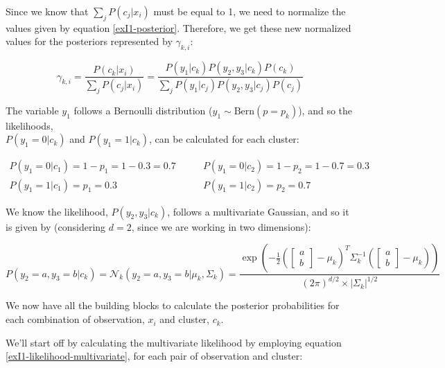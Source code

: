 \documentclass[12pt]{article}
\begin{document}
\begin{enumerate}[leftmargin=\labelsep]
        Since we know that $\sum_j P(c_j|x_i)$ must be equal to 1, we need to normalize the values given by equation \eqref{exI1-posterior}.
        Therefore, we get these new normalized values for the posteriors represented by $\gamma_{k,i}$:

        \begin{equation}\label{exI1-gamma}
          \gamma_{k,i} = \frac{P(c_k | x_i)}{\sum_j P(c_j | x_i)}
          = \frac{P(y_1|c_k)P(y_2,y_3|c_k)P(c_k)}{\sum_j P(y_1|c_j)P(y_2,y_3|c_j)P(c_j)}
        \end{equation}

        The variable $y_1$ follows a Bernoulli distribution ($y_1 \sim \text{Bern}\left(p=p_k\right)$), and so the likelihoods,\\
        $P(y_1=0|c_k)$ and $P(y_1=1|c_k)$, can be calculated for each cluster:

        \vskip -0.4cm
        \begin{align*}
          P(y_1 = 0 | c_1) = 1 - p_1 = 1 - 0.3 = 0.7 & \qquad P(y_1 = 0 | c_2) = 1 - p_2 = 1 - 0.7 = 0.3 \\
          P(y_1 = 1 | c_1) = p_1 = 0.3               & \qquad P(y_1 = 1 | c_2) = p_2 = 0.7
        \end{align*}

        We know the likelihood, $P(y_2,y_3|c_k)$, follows a multivariate Gaussian, and so it is given by
        (considering $d = 2$, since we are working in two dimensions):

        \vskip -0.2cm
        \begin{equation}\label{exI1-likelihood-multivariate}
          P(y_2=a,y_3=b|c_k) = \mathcal{N}_k(y_2=a,y_3=b|\mu_k, \Sigma_k)
          = \frac{
          \exp\left(-\frac{1}{2} \left(\begin{bmatrix} a \\ b \end{bmatrix} - \mu_k\right)^T
          \Sigma_k^{-1} \left(\begin{bmatrix} a \\ b \end{bmatrix} - \mu_k\right)\right)}{(2\pi)^{d/2} \times |\Sigma_k|^{1/2}}
        \end{equation}

        We now have all the building blocks to calculate the posterior probabilities
        for each combination of observation, $x_i$ and cluster, $c_k$.

        We'll start off by calculating the multivariate likelihood by employing equation
        \eqref{exI1-likelihood-multivariate}, for each pair of observation and cluster:


\end{enumerate}
\end{document}
